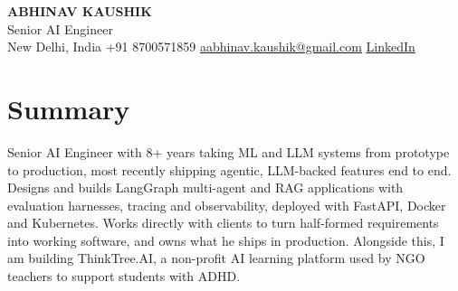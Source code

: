 \documentclass[10pt,a4paper]{article}
\begin{document}
\begin{center}
  {\LARGE\bfseries ABHINAV KAUSHIK}\\[2pt]
  {\large Senior AI Engineer}\\[2pt]
  New Delhi, India \textbar{} +91 8700571859 \textbar{} \href{mailto:aabhinav.kaushik@gmail.com}{aabhinav.kaushik@gmail.com} \textbar{} \href{https://www.linkedin.com/in/abhinav-kaushik10/}{LinkedIn}  
\end{center}

\section{Summary}
Senior AI Engineer with 8+ years taking ML and LLM systems from prototype to production, most recently shipping agentic, LLM-backed features end to end. Designs and builds LangGraph multi-agent and RAG applications with evaluation harnesses, tracing and observability, deployed with FastAPI, Docker and Kubernetes. Works directly with clients to turn half-formed requirements into working software, and owns what he ships in production. Alongside this, I am building ThinkTree.AI, a non-profit AI learning platform used by NGO teachers to support students with ADHD.
\end{document}
